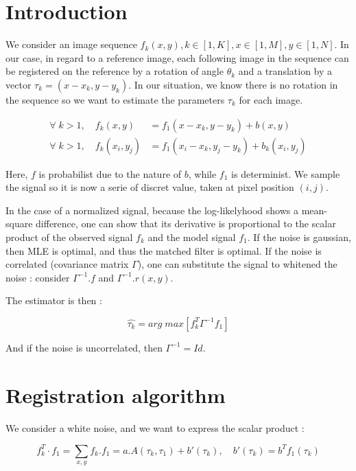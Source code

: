 \section{Introduction}

We consider an image sequence $f_{k}(x, y), k \in[1, K], x \in[1, M], y \in[1, N]$. In our case, in regard to a reference image, each following image in the sequence can be registered on the reference by a rotation of angle $\theta_k$ and a translation by a vector $\tau_k = (x-x_k, y-y_k)$. In our situation, we know there is no rotation in the sequence so we want to estimate the parameters $\tau_k$ for each image.


\begin{align*}
\forall \; k>1, \quad f_k(x, y) &= f_{1}\left(x-x_{k}, y-y_{k}\right) + b(x, y) \\
\forall \; k>1, \quad f_{k}(x_i, y_j) &= f_{1}\left(x_i-x_{k}, y_j-y_{k}\right) + b_{k}(x_i, y_j)
\end{align*}

Here, $f$ is probabilist due to the nature of $b$, while $f_1$ is determinist. We sample the signal so it is now a serie of discret value, taken at pixel position $(i, j)$.

In the case of a normalized signal, because the log-likelyhood shows a mean-square difference, one can show that its derivative is proportional to the scalar product of the observed signal $f_k$ and the model signal $f_1$. If the noise is gaussian, then MLE is optimal, and thus the matched filter is optimal. If the noise is correlated (covariance matrix $\Gamma$), one can substitute the signal to whitened the noise : consider $\Gamma^{-1} . f$ and $\Gamma^{-1} . r(x, y)$.

The estimator is then :


\begin{equation}
\hat{\tau_k} = arg \; max \left[ f_k^T\Gamma^{-1} f_1 \right]
\end{equation}

And if the noise is uncorrelated, then $\Gamma^{-1} = Id$.

\section{Registration algorithm}
We consider a white noise, and we want to express the scalar product :


\begin{equation}
f_k^T \cdot f_1 = \sum_{x,y} f_k . f_1 = a . A(\tau_k,\tau_1) + b'(\tau_k), \quad b'(\tau_k) = b^T f_1(\tau_k)
\end{equation}

